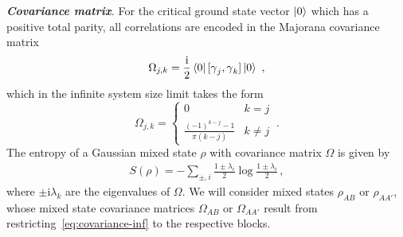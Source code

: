 \documentclass[prl,a4paper,notitlepage,twocolumn,superscriptaddress,longbibliography,reprint]{revtex4-2}
\newcommand{\ii}{\mathrm{i}}
\newcommand{\m}{\operatorname{\gamma}}
\newcommand{\mysection}[1]{{\vspace{10 pt}\noindent \emph{{\textbf{#1}}.}}}
\begin{document}
\mysection{Covariance matrix} For the critical ground state vector $\ket{0}$ which has a positive total parity, all correlations are encoded in the Majorana covariance matrix 
\begin{equation}
\Omega_{j,k} = \frac{\ii}{2} \bra{0} [\m_j, \m_k] \ket{0} \ ,
\end{equation}
which in the infinite system size limit takes the form
\begin{equation}
\Omega_{j,k} =
\begin{cases}
0 &  k = j  \\
\frac{(-1)^{k-j} - 1}{\pi (k-j)} &  k \neq j
\end{cases} \ .\label{eq:covariance-inf}
\end{equation}
The entropy of a Gaussian mixed state $\rho$ with covariance matrix $\Omega$ is given by
\begin{align}
    S(\rho)=-\sum_{\pm, i}\frac{1\pm\lambda_i}{2}\log\frac{1\pm\lambda_i}{2}\,,\label{eq:Gaussain-SA}
\end{align}
where $\pm\ii \lambda_k$ are the eigenvalues of $\Omega$. We will consider mixed states $\rho_{AB}$ or $\rho_{AA'}$, whose mixed state covariance matrices $\Omega_{AB}$ or $\Omega_{AA'}$ result from restricting~\eqref{eq:covariance-inf} to the respective blocks.
\end{document}
